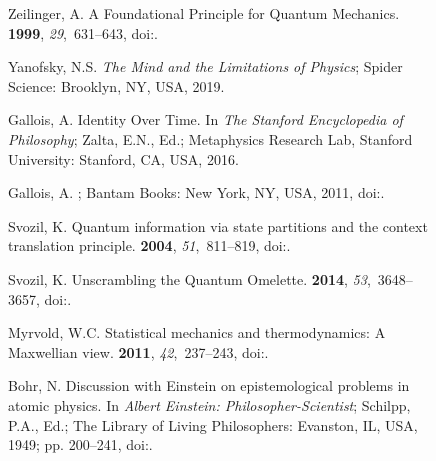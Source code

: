 \documentclass[entropy,article,accept,oneauthor,pdftex]{Definitions/mdpi}
\begin{document}
\begin{figure}[H]
\begin{thebibliography}{999}
Zeilinger, A.
\newblock A Foundational Principle for Quantum Mechanics.
 {\bf 1999}, {\em 29},~631--643, doi:{\href{https://doi.org/10.1023/A:1018820410908}{}}.

Yanofsky, N.S.
\newblock \emph{The Mind and the Limitations of Physics}; Spider Science: Brooklyn, NY, USA, 2019.

Gallois, A.
\newblock Identity Over Time. In {\em The {S}tanford Encyclopedia of
  Philosophy};  Zalta, E.N., Ed.; Metaphysics Research Lab, Stanford University: Stanford, CA, USA, 2016.

Gallois, A.
; Bantam Books: New York, NY, USA, 2011, %
doi:{\href{https://doi.org/10.1093/acprof:oso/9780199261833.001.0001}{}}.

Svozil, K.
\newblock Quantum information via state partitions and the context translation
  principle.
 {\bf 2004}, {\em 51},~811--819, doi:{\href{https://doi.org/10.1080/09500340410001664179}{}}.

Svozil, K.
\newblock Unscrambling the Quantum Omelette.
 {\bf 2014}, {\em 53},~3648--3657, doi:{\href{https://doi.org/10.1007/s10773-013-1995-3}{}}.

Myrvold, W.C.
\newblock Statistical mechanics and thermodynamics: A {M}axwellian view.
 {\bf 2011}, {\em 42},~237--243, doi:{\href{https://doi.org/10.1016/j.shpsb.2011.07.001}{}}.

Bohr, N.
\newblock Discussion with {E}instein on epistemological problems in atomic
  physics. In {\em {A}lbert {E}instein: Philosopher-Scientist}; Schilpp, P.A.,
  Ed.; The Library of Living Philosophers: Evanston, IL, USA, 1949; pp. 200--241, doi:{\href{https://doi.org/10.1016/S1876-0503(08)70379-7}{}}.


\end{thebibliography}
\end{figure}
\end{document}
